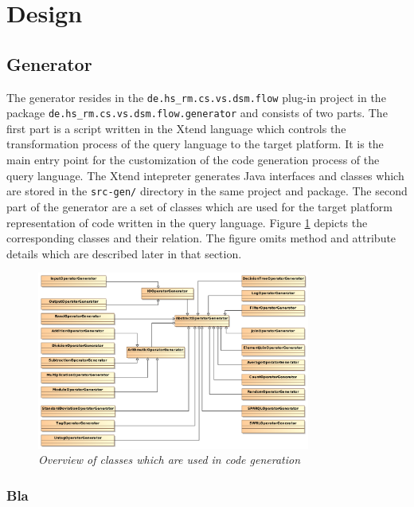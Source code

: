 \section{Design}
\subsection{Generator}
The generator resides in the \texttt{de.hs\_rm.cs.vs.dsm.flow} plug-in project 
in the package \texttt{de.hs\-\_rm.\-cs.vs.dsm.flow.generator} and consists of 
two parts. The first part is a script written in the Xtend \cite{xtend} language 
which controls the transformation process of the query language to the target 
platform. It is the main entry point for the customization of the code 
generation process of the query language. The Xtend intepreter generates 
Java interfaces and classes which are stored in the \texttt{src-gen/} directory
in the same project and package. The second part of the generator are a set of
classes which are used for the target platform representation of code written in
the query language. Figure \ref{fig:generator} depicts the corresponding classes
and their relation. The figure omits method and attribute details which are 
described later in that section.
\begin{figure}[htpb]
  \centering
  \includegraphics[width=0.8\textwidth]{figures/overview}
  \caption{\emph{Overview of classes which are used in code generation}}
  \label{fig:generator}
\end{figure}
\subsubsection{Bla}

